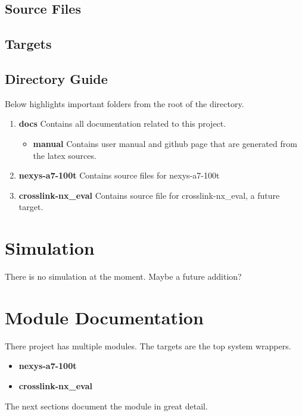 \subsection{Source Files}



\subsection{Targets} \label{targets}



\subsection{Directory Guide}

\par
Below highlights important folders from the root of the directory.

\begin{enumerate}
  \item \textbf{docs} Contains all documentation related to this project.
    \begin{itemize}
      \item \textbf{manual} Contains user manual and github page that are generated from the latex sources.
    \end{itemize}
  \item \textbf{nexys-a7-100t} Contains source files for nexys-a7-100t
  \item \textbf{crosslink-nx\_eval} Contains source file for crosslink-nx\_eval, a future target.
\end{enumerate}

\newpage

\section{Simulation}
\par
There is no simulation at the moment. Maybe a future addition?

\newpage

\section{Module Documentation} \label{Module Documentation}

\par
There project has multiple modules. The targets are the top system wrappers.

\begin{itemize}
\item \textbf{nexys-a7-100t}
\item \textbf{crosslink-nx\_eval}
\end{itemize}
The next sections document the module in great detail.


